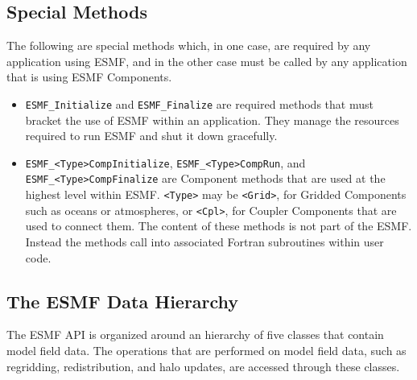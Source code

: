 \subsection{Special Methods}

The following are special methods which, in one case,
are required by any application using ESMF, and in the 
other case must be called by any application that is using 
ESMF Components.

\begin{itemize}

\item {\tt ESMF\_Initialize} and {\tt ESMF\_Finalize} are required 
methods that must bracket the use of ESMF within an application.  
They manage the resources required to run ESMF and shut it down
gracefully.
\item {\tt ESMF\_<Type>CompInitialize}, {\tt ESMF\_<Type>CompRun}, and 
{\tt ESMF\_<Type>CompFinalize} are Component methods that are used at the 
highest level within ESMF.  {\tt <Type>} may be {\tt <Grid>}, for 
Gridded Components such as oceans or atmospheres, or
{\tt <Cpl>}, for Coupler Components that are used to connect 
them.  The content of these methods is not part of the ESMF.  
Instead the methods call into associated Fortran subroutines within 
user code.

\end{itemize}

\subsection{The ESMF Data Hierarchy}

The ESMF API is organized around an hierarchy of five classes that 
contain model field data.  The operations that are performed
on model field data, such as regridding, redistribution, and halo 
updates, are accessed through these classes.  

